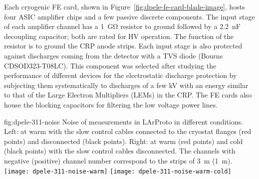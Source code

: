 Each cryogenic FE card, shown in Figure~\ref{fig:dpele-fe-card-blade-image}, hosts four ASIC amplifier chips and a few passive discrete components. The input stage of each amplifier channel has a \SI{1}{\giga\ohm} resistor to ground followed by a \SI{2.2}{\nano\farad} decoupling capacitor; both are rated for HV operation. The function of the resistor is to ground the CRP anode strips. Each input stage is also protected against discharges coming from the detector with a TVS diode (Bourns CDSOD323-T08LC). This component was selected after studying the performance of different devices for the electrostatic discharge protection by subjecting them systematically to discharges of a few kV with an energy similar to that of the Large Electron Multipliers (LEMs) in the CRP. The FE cards also house the blocking capacitors for filtering the low voltage power lines.

\begin{dunefigure}{fig:dpele-311-noise}
{Noise of measurements in LArProto in different conditions. Left: at warm with the slow control cables connected to the cryostat flanges (red points) and disconnected (black points). Right: at warm (red points) and cold (black points) with the slow control cables disconnected. The channels with negative (positive) channel number correspond to the strips of \SI{3}{\meter} (\SI{1}{\meter}).}
\texttt{[image: dpele-311-noise-warm]}
\texttt{[image: dpele-311-noise-warm-cold]}
\end{dunefigure}

